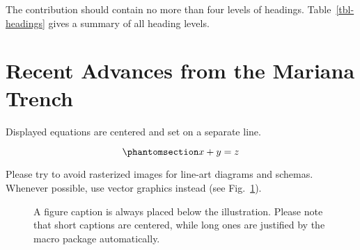 \documentclass[runningheads]{llncs}
\begin{document}
The contribution should contain no more than four levels of headings.
Table~\ref{tbl-headings} gives a summary of all heading levels.

\begin{table}

\caption{\label{tbl-headings}Table captions should be placed above the
tables.}


\end{table}%

\section{Recent Advances from the Mariana
Trench}\label{recent-advances-from-the-mariana-trench}

Displayed equations are centered and set on a separate line.

\begin{equation}\phantomsection\label{eq-linear}{
x + y = z
}\end{equation}

Please try to avoid rasterized images for line-art diagrams and schemas.
Whenever possible, use vector graphics instead (see
Fig.~\ref{fig-duck}).

\begin{figure}[t]


\caption{\label{fig-duck}A figure caption is always placed below the
illustration. Please note that short captions are centered, while long
ones are justified by the macro package automatically.}

\end{figure}%
\end{document}
